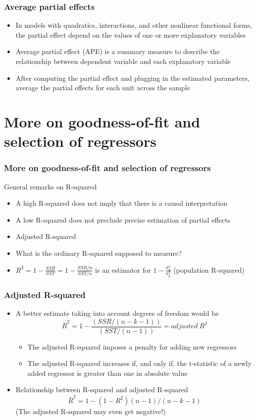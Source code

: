 \documentclass[aspectratio=169]{beamer}
\begin{document}
\begin{frame}
    \frametitle{Average partial effects}
    \begin{itemize}
        \item In models with quadratics, interactions, and other nonlinear functional forms, the partial effect depend on the values of one or more explanatory variables
        \item Average partial effect (APE) is a summary measure to describe the relationship between dependent variable and each explanatory variable
	\item After computing the partial effect and plugging in the estimated parameters, average the partial effects for each unit across the sample
            \end{itemize}           
\end{frame}

\section{More on goodness-of-fit and selection of regressors}
\begin{frame}
    \frametitle{More on goodness-of-fit and selection of regressors}
General remarks on R-squared

    \begin{itemize}
        \item A high R-squared does not imply that there is a causal interpretation
\item A low R-squared does not preclude precise estimation of partial effects
\item Adjusted R-squared
\item What is the ordinary R-squared supposed to measure?
\item $R^2= 1- \frac{SSR}{SST} = 1-\frac{SSR/n}{SST/n}$ is an estimator for $1-\frac{\sigma^2_u}{\sigma^2_y}$ (population R-squared)
            \end{itemize}
            
\end{frame}


\begin{frame}
    \frametitle{Adjusted R-squared}
    \begin{itemize}
        \item A better estimate taking into account degrees of freedom would be
\[\bar R^2 = 1 - \frac{(SSR/(n-k-1))}{(SST/(n-1))} = adjusted ~ R^2
\]
\begin{itemize}
\item The adjusted R-squared imposes a penalty for adding new regressors
\item The adjusted R-squared increases if, and only if, the t-statistic of a newly added regressor is greater than one in absolute value

\end{itemize}
\item  Relationship between R-squared and adjusted R-squared
\[ \bar R^2 = 1 - (1- R^2)(n-1)/(n-k-1)\]
(The adjusted R-squared may even get negative!)
            \end{itemize}

          
\end{frame}
\end{document}

